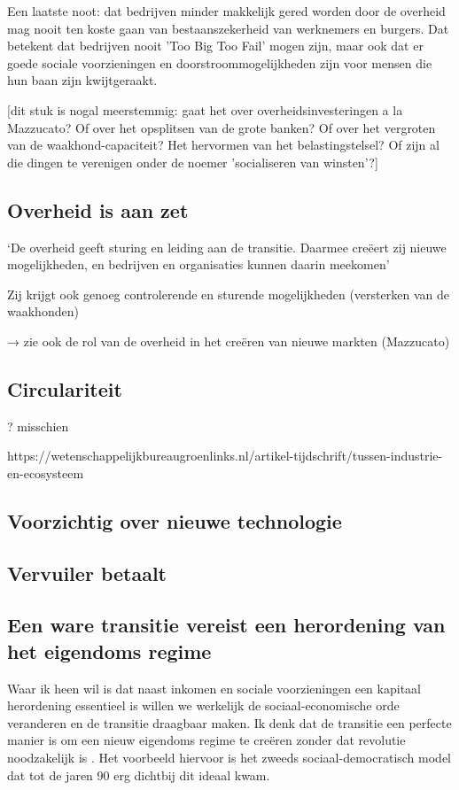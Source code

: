 Een laatste noot: dat bedrijven minder makkelijk gered worden door de overheid mag nooit ten koste gaan van bestaanszekerheid van werknemers en burgers. Dat betekent dat bedrijven nooit 'Too Big Too Fail' mogen zijn, maar ook dat er goede sociale voorzieningen en doorstroommogelijkheden zijn voor mensen die hun baan zijn kwijtgeraakt.

[dit stuk is nogal meerstemmig: gaat het over overheidsinvesteringen a la Mazzucato? Of over het opsplitsen van de grote banken? Of over het vergroten van de waakhond-capaciteit? Het hervormen van het belastingstelsel? Of zijn al die dingen te verenigen onder de noemer 'socialiseren van winsten'?]

\subsection{Overheid is aan zet}
‘De overheid geeft sturing en leiding aan de transitie. Daarmee creëert zij nieuwe mogelijkheden, en bedrijven en organisaties kunnen daarin meekomen’

Zij krijgt ook genoeg controlerende en sturende mogelijkheden (versterken van de waakhonden)

→ zie ook de rol van de overheid in het creëren van nieuwe markten (Mazzucato)

\subsection{Circulariteit}
? misschien 

https://wetenschappelijkbureaugroenlinks.nl/artikel-tijdschrift/tussen-industrie-en-ecosysteem

\subsection{Voorzichtig over nieuwe technologie}

\subsection{Vervuiler betaalt}

\subsection{Een ware transitie vereist een herordening van het eigendoms regime}

Waar ik heen wil is dat naast inkomen en sociale voorzieningen een kapitaal herordening essentieel is willen we werkelijk de sociaal-economische orde veranderen en de transitie draagbaar maken. Ik denk dat de transitie een perfecte manier is om een nieuw eigendoms regime te creëren zonder dat revolutie noodzakelijk is . Het voorbeeld hiervoor is het zweeds sociaal-democratisch model dat tot de jaren 90 erg dichtbij dit ideaal kwam. 

